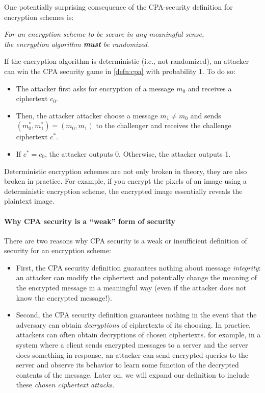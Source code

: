 One potentially surprising consequence of the CPA-security definition 
for encryption schemes is:
\begin{center}
\emph{For an encryption scheme to be secure in any meaningful sense,\\
the encryption algorithm \textbf{must} be randomized}.
\end{center}

If the encryption algorithm is deterministic (i.e., not randomized),
an attacker can win the CPA security game in \cref{defn:cpa}
with probability 1.
To do so:
\begin{itemize}[noitemsep]
  \item The attacker first asks for encryption of a message $m_0$
and receives a ciphertext $c_0$.
  \item Then, the attacker attacker choose a message $m_1 \neq m_0$ and
sends $(m^*_0, m^*_1) = (m_0, m_1)$ to the challenger
and receives the challenge ciphertext $c^*$.
  \item If $c^* = c_0$, the attacker outputs 0.
Otherwise, the attacker outputs 1.
\end{itemize}

Deterministic encryption schemes are not only broken in theory,
they are also broken in practice.
For example, if you encrypt the pixels of an image using a deterministic
encryption scheme, the encrypted image essentially reveals the plaintext image.

\paragraph{Why CPA security is a ``weak'' form of security}
There are two reasons why CPA security is a weak or insufficient 
definition of security for an encryption scheme:
\begin{itemize}
  \item First, the CPA security definition
    guarantees nothing about message
    \emph{integrity}: an attacker can modify the
    ciphertext and potentially change the meaning
    of the encrypted message in a meaningful way
    (even if the attacker does not know the encrypted message!).
  \item Second, the CPA security definition guarantees
    nothing in the event that the adversary can obtain
    \emph{decryptions} of ciphertexts of its choosing.
    In practice, attackers can often obtain decryptions
    of chosen ciphertexts.
    for example, in a system where a client sends encrypted messages to a server and the server does something in response, an attacker can send encrypted queries to the server and observe its behavior to learn some function of the decrypted contents of the message. Later on, we will expand our definition to include these \textit{chosen ciphertext attacks}.
\end{itemize}

